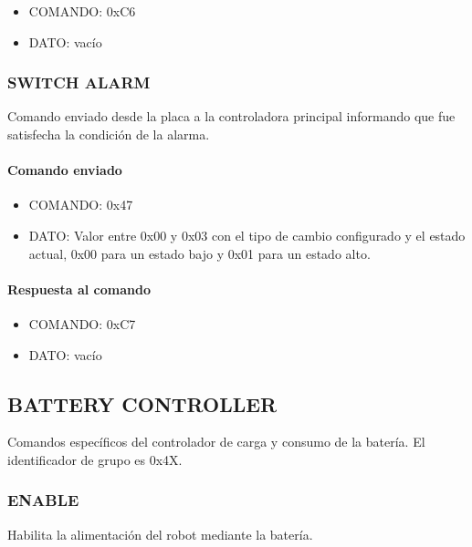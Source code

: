 \begin{itemize}
	\item{COMANDO:} 0xC6
	\item{DATO:} vac\'io
\end{itemize}

\subsubsection{SWITCH ALARM}
\label{hA_protocolo_switch_alarm_ds}

Comando enviado desde la placa a la controladora principal informando que fue satisfecha la condici\'on de la alarma.

\paragraph*{Comando enviado}

\begin{itemize}
	\item{COMANDO:} 0x47
	\item{DATO:} Valor entre 0x00 y 0x03 con el tipo de cambio configurado y el estado actual, 0x00 para un estado bajo y
	0x01 para un estado alto.
\end{itemize}

\paragraph*{Respuesta al comando}

\begin{itemize}
	\item{COMANDO:} 0xC7
	\item{DATO:} vac\'io
\end{itemize}

\subsection{BATTERY CONTROLLER} 
\label{hA_protocolo_grupo_battery_controller}

Comandos espec\'ificos del controlador de carga y consumo de la bater\'ia.
El identificador de grupo es 0x4X.

\subsubsection{ENABLE}
\label{hA_protocolo_get_battery_value}

Habilita la alimentaci\'on del robot mediante la bater\'ia.

